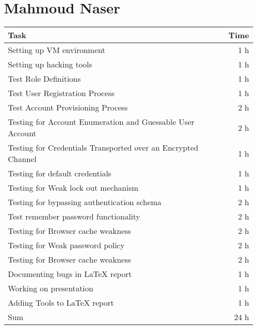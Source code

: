 \clearpage
\section*{Mahmoud Naser}
\begin{table}[h!tpb]
  \centering
  \begin{tabularx}{\textwidth}{X r}
    \toprule
      Task & Time \\
    \midrule
      Setting up VM environment & 1 h \\
      Setting up hacking tools & 1 h \\

      Test Role Definitions & 1 h \\
      Test User Registration Process & 1 h \\
      Test Account Provisioning Process & 2 h \\
      Testing for Account Enumeration and Guessable User Account & 2 h \\

      Testing for Credentials Transported over an Encrypted Channel & 1 h \\
      Testing for default credentials & 1 h \\
      Testing for Weak lock out mechanism & 1 h \\
      Testing for bypassing authentication schema & 2 h \\
      Test remember password functionality & 2 h \\
      Testing for Browser cache weakness & 2 h \\
      Testing for Weak password policy & 2 h \\
      Testing for Browser cache weakness & 2 h \\

      Documenting bugs in \LaTeX{} report & 1 h \\
      Working on presentation & 1 h \\
      Adding Tools to \LaTeX{} report & 1 h \\
    \midrule
      Sum & 24 h \\
    \bottomrule
  \end{tabularx}
\end{table}
